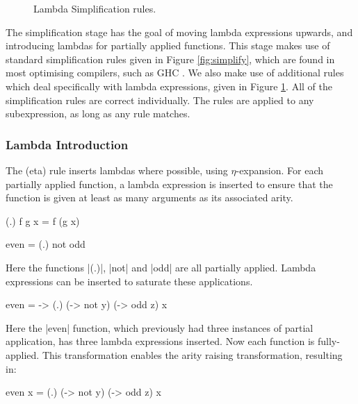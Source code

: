 \begin{figure}
\begin{simplify}




\end{simplify}
\caption{Lambda Simplification rules.}
\label{fig:lambda_simplify}
\end{figure}

The simplification stage has the goal of moving lambda expressions upwards, and introducing lambdas for partially applied functions. This stage makes use of standard simplification rules given in Figure \ref{fig:simplify}, which are found in most optimising compilers, such as GHC \cite{spj:transformation}. We also make use of additional rules which deal specifically with lambda expressions, given in Figure \ref{fig:lambda_simplify}. All of the simplification rules are correct individually. The rules are applied to any subexpression, as long as any rule matches.

\subsubsection{Lambda Introduction}

The (eta) rule inserts lambdas where possible, using $\eta$-expansion. For each partially applied function, a lambda expression is inserted to ensure that the function is given at least as many arguments as its associated arity.

\begin{example}
\ignore\begin{code}
(.) f g x = f (g x)

even = (.) not odd
\end{code}

\noindent Here the functions |(.)|, |not| and |odd| are all partially applied. Lambda expressions can be inserted to saturate these applications.

\begin{code}
even = \x -> (.) (\y -> not y) (\z -> odd z) x
\end{code}

\noindent Here the |even| function, which previously had three instances of partial application, has three lambda expressions inserted. Now each function is fully-applied. This transformation enables the arity raising transformation, resulting in:

\begin{code}
even x = (.) (\y -> not y) (\z -> odd z) x
\end{code}
\end{example}

